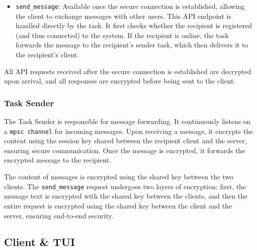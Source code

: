 \begin{itemize}
    \item \texttt{send\_message}: Available once the secure connection is established, allowing the client to exchange messages with other users. This API endpoint is handled directly by the task. It first checks whether the recipient is registered (and thus connected) to the system. If the recipient is online, the task forwards the message to the recipient's sender task, which then delivers it to the recipient's client.
\end{itemize}

All API requests received after the secure connection is established are decrypted upon arrival, and all responses are encrypted before being sent to the client. 

\subsubsection{Task Sender}
\label{subsec:TaskSender}

The Task Sender is responsible for message forwarding. It continuously listens on a \texttt{mpsc channel} for incoming messages. Upon receiving a message, it encrypts the content using the session key shared between the recipient client and the server, ensuring secure communication. Once the message is encrypted, it forwards the encrypted message to the recipient.

The content of messages is encrypted using the shared key between the two clients. The \texttt{send\_message} request undergoes two layers of encryption: first, the message text is encrypted with the shared key between the clients, and then the entire request is encrypted using the shared key between the client and the server, ensuring end-to-end security.





\subsection{Client \& TUI}
\label{subsec:ClientTUI}

